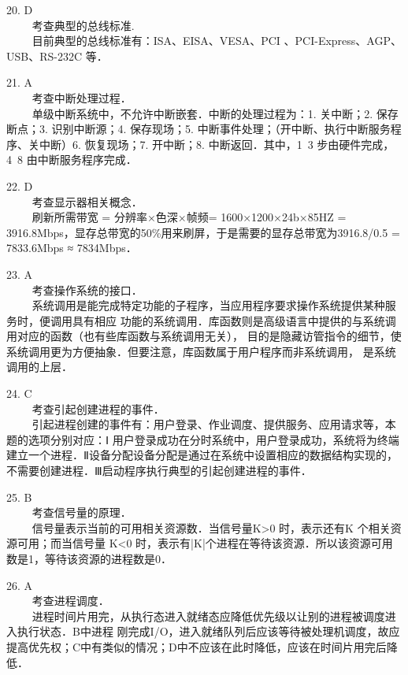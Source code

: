 20. D \\
$\qquad$ 考查典型的总线标准. \\
$\qquad$ 目前典型的总线标准有：ISA、EISA、VESA、PCI 、PCI-Express、AGP、USB、RS-232C 等．

21. A \\
$\qquad$ 考查中断处理过程．\\
$\qquad$ 单级中断系统中，不允许中断嵌套．中断的处理过程为：1. 关中断；2. 保存断点；3. 识别中断源；4. 保存现场；5. 中断事件处理；（开中断、执行中断服务程序、关中断）6. 恢复现场；7. 开中断；8. 中断返回．其中，1~3 步由硬件完成，4~8 由中断服务程序完成．

22. D \\
$\qquad$ 考查显示器相关概念．\\
$\qquad$ 刷新所需带宽 = 分辨率×色深×帧频= 1600×1200×24b×85HZ = 3916.8Mbps，显存总带宽的50\%用来刷屏，于是需要的显存总带宽为3916.8/0.5 = 7833.6Mbps ≈ 7834Mbps．

23. A \\
$\qquad$ 考查操作系统的接口．\\
$\qquad$ 系统调用是能完成特定功能的子程序，当应用程序要求操作系统提供某种服务时，便调用具有相应
功能的系统调用．库函数则是高级语言中提供的与系统调用对应的函数（也有些库函数与系统调用无关），
目的是隐藏访管指令的细节，使系统调用更为方便抽象．但要注意，库函数属于用户程序而非系统调用，
是系统调用的上层．

24. C \\
$\qquad$ 考查引起创建进程的事件．\\
$\qquad$ 引起进程创建的事件有：用户登录、作业调度、提供服务、应用请求等，本题的选项分别对应：Ⅰ
用户登录成功在分时系统中，用户登录成功，系统将为终端建立一个进程．Ⅱ设备分配设备分配是通过在系统中设置相应的数据结构实现的，不需要创建进程．Ⅲ启动程序执行典型的引起创建进程的事件．

25. B \\
$\qquad$ 考查信号量的原理．\\
$\qquad$ 信号量表示当前的可用相关资源数．当信号量K>0 时，表示还有K 个相关资源可用；而当信号量
K<0 时，表示有|K|个进程在等待该资源．所以该资源可用数是1，等待该资源的进程数是0．

26. A \\
$\qquad$ 考查进程调度．\\
$\qquad$ 进程时间片用完，从执行态进入就绪态应降低优先级以让别的进程被调度进入执行状态．B中进程
刚完成I/O，进入就绪队列后应该等待被处理机调度，故应提高优先权；C中有类似的情况；D中不应该在此时降低，应该在时间片用完后降低．

